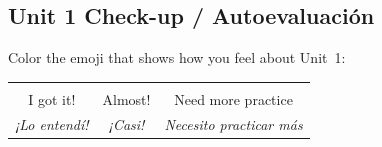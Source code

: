 \vspace{10pt}

\subsection*{ Unit 1 Check-up / Autoevaluación}

{\color{kidsGray}Color the emoji that shows how you feel about Unit~1:}

\bigskip
\begin{center}
\begin{tabular}{ccc}
{\Huge \emoji{😊}} & {\Huge \emoji{😐}} & {\Huge \emoji{😟}} \\[4pt]
{\small I got it!} & {\small Almost!} & {\small Need more practice} \\
{\small \textit{¡Lo entendí!}} & {\small \textit{¡Casi!}} & {\small \textit{Necesito practicar más}} \\
\end{tabular}
\end{center}
